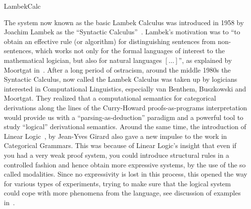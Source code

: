 \begin{entry}{LambekCalc}
\begin{history}
The system now known as the basic Lambek Calculus was introduced in
1958 by Joachim Lambek as the ``Syntactic Calculus''~\cite{lambek1958}.
Lambek's motivation was to ``to obtain an effective rule (or
algorithm) for distinguishing sentences from non-sentences, which
works not only for the formal languages of interest to the
mathematical logician, but also for natural languages $[\ldots]$'', as
explained by Moortgat in~\cite{moortgat2010}.  After a long period of
ostracism, around the middle 1980s the Syntactic Calculus, now called
the Lambek Calculus was taken up by logicians interested in
Computational Linguistics, especially van Benthem, Buszkowski and
Moortgat. They realized that a computational semantics for categorical
derivations along the lines of the Curry-Howard proofs-as-programs
interpretation would provide us with a ``parsing-as-deduction''
paradigm and a powerful tool to study ``logical'' derivational
semantics. Around the same time, the introduction of Linear Logic~, by
Jean-Yves Girard also gave a new impulse to the work in
Categorical Grammars. This was because of Linear Logic's insight that
even if you had a very weak proof system, you could introduce
structural rules in a controlled fashion and hence obtain more
expressive systems, by the use of the so called modalities. Since no
expressivity is lost in this process, this opened the way for various
types of experiments, trying to make sure that the logical system
could cope with more phenomena from the language, see discussion of
examples in~\cite{moortgat2010}.
\end{history}


\end{entry}
